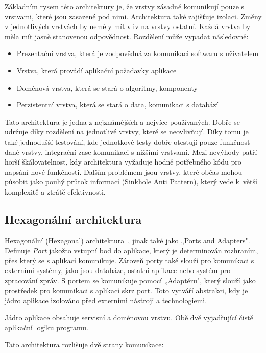 Základním rysem této architektury je, že vrstvy zásadně komunikují pouze s vrstvami, které jsou zasazené pod nimi. Architektura také zajišťuje izolaci. Změny v jednotlivých vrstvách by neměly mít vliv na vrstvy ostatní. Každá vrstva by měla mít jasně stanovenou odpovědnost. Rozdělení může vypadat následovně:

\begin{itemize}
    \item Prezentační vrstva, která je zodpovědná za komunikaci softwaru s uživatelem
    \item Vrstva, která provádí aplikační požadavky aplikace
    \item Doménová vrstva, která se stará o algoritmy, komponenty
    \item Perzistentní vrstva, která se stará o data, komunikaci s databází
\end{itemize}

Tato architektura je jedna z nejznámějších a nejvíce používaných. Dobře se udržuje díky rozdělení na jednotlivé vrstvy, které se neovlivňují. Díky tomu je také jednodušší testování, kde jednotkové testy dobře otestují pouze funkčnost dané vrstvy, integrační zase komunikaci s nižšími vrstvami.
Mezi nevýhody patří horší škálovatelnost, kdy architektura vyžaduje hodně potřebného kódu pro napsání nové funkčnosti. Dalším problémem jsou vrstvy, které občas mohou působit jako pouhý průtok informací (Sinkhole Anti Pattern)\cite{Layer2}, který vede k~větší komplexitě a ztrátě efektivnosti.

\subsection{Hexagonální architektura}

Hexagonální (Hexagonal) architektura~\cite{Hexagonal}, jinak také jako „Ports and Adapters". Definuje \textit{Port} jakožto vstupní bod do aplikace, který je determinován rozhraním, přes který se s aplikací komunikuje. Zároveň porty také slouží pro komunikaci s externími systémy, jako jsou databáze, ostatní aplikace nebo systém pro zpracování zpráv. S portem se komunikuje pomocí „Adaptéru", který slouží jako prostředek pro komunikaci s aplikací skrz port. Toto vytváří abstrakci, kdy je jádro aplikace izolováno před externími nástroji a technologiemi.

Jádro aplikace obsahuje servisní a doménovou vrstvu. Obě dvě vyjadřující čistě aplikační logiku programu.

Tato architektura rozlišuje dvě strany komunikace:

